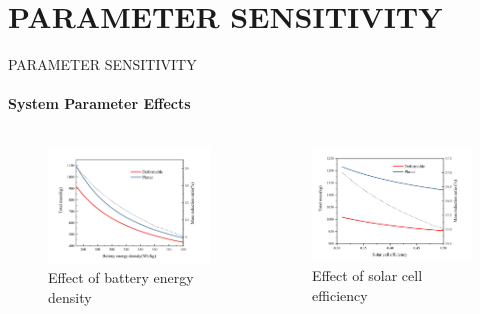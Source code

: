 \documentclass{beamer}
\begin{document}
\section{PARAMETER SENSITIVITY} 
\begin{frame}{PARAMETER SENSITIVITY}
    \framesubtitle{System Parameter Effects}
    
    \begin{columns}
        \begin{column}{0.5\textwidth}
            \begin{figure}
                \centering
                \includegraphics[width=\textwidth]{battery_sensitivity.png}
                \caption{Effect of battery energy density}
            \end{figure}
        \end{column}
        \begin{column}{0.5\textwidth}
            \begin{figure}
                \centering
                \includegraphics[width=\textwidth]{solar_sensitivity.png}
                \caption{Effect of solar cell efficiency}
            \end{figure}
        \end{column}
    \end{columns}
\end{frame}
\end{document}
